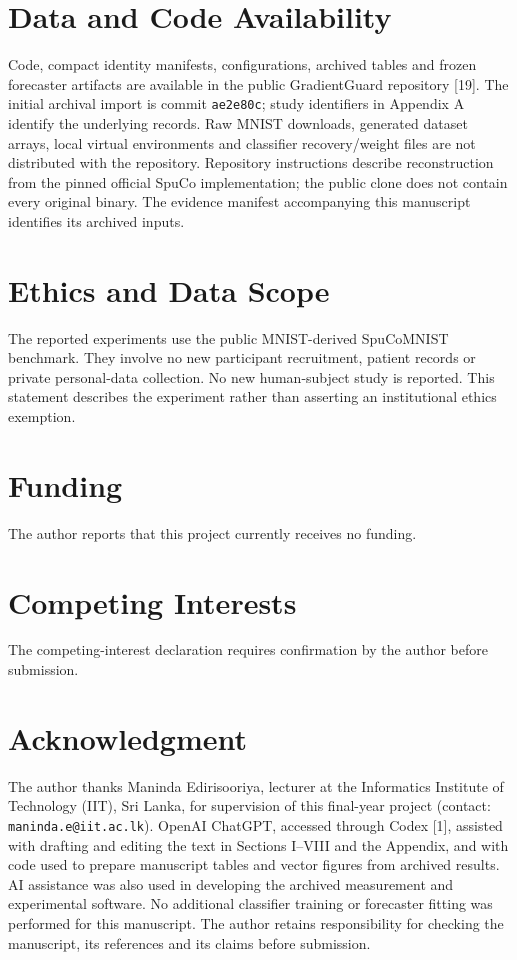 \section*{Data and Code Availability}
Code, compact identity manifests, configurations, archived tables and frozen forecaster artifacts are available in the public GradientGuard repository [19]. The initial archival import is commit \texttt{ae2e80c}; study identifiers in Appendix A identify the underlying records. Raw MNIST downloads, generated dataset arrays, local virtual environments and classifier recovery/weight files are not distributed with the repository. Repository instructions describe reconstruction from the pinned official SpuCo implementation; the public clone does not contain every original binary. The evidence manifest accompanying this manuscript identifies its archived inputs.

\section*{Ethics and Data Scope}
The reported experiments use the public MNIST-derived SpuCoMNIST benchmark. They involve no new participant recruitment, patient records or private personal-data collection. No new human-subject study is reported. This statement describes the experiment rather than asserting an institutional ethics exemption.

\section*{Funding}
The author reports that this project currently receives no funding.

\section*{Competing Interests}
The competing-interest declaration requires confirmation by the author before submission.

\section*{Acknowledgment}
The author thanks Maninda Edirisooriya, lecturer at the Informatics Institute of Technology (IIT), Sri Lanka, for supervision of this final-year project (contact: \texttt{maninda.e@iit.ac.lk}). OpenAI ChatGPT, accessed through Codex [1], assisted with drafting and editing the text in Sections I--VIII and the Appendix, and with code used to prepare manuscript tables and vector figures from archived results. AI assistance was also used in developing the archived measurement and experimental software. No additional classifier training or forecaster fitting was performed for this manuscript. The author retains responsibility for checking the manuscript, its references and its claims before submission.

